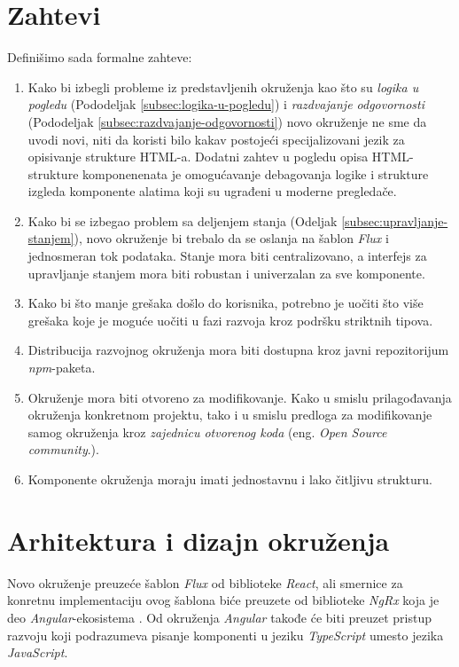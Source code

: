 \documentclass[12pt,oneside]{memoir}
\begin{document}
\section{Zahtevi}\label{sec:zahtevi}
Definišimo sada formalne zahteve:
\begin{enumerate}
  \item Kako bi izbegli probleme iz predstavljenih okruženja kao što su
  \emph{logika u pogledu} (Pododeljak \ref{subsec:logika-u-pogledu}) i
  \emph{razdvajanje odgovornosti} (Pododeljak \ref{subsec:razdvajanje-odgovornosti})
  novo okruženje ne sme da uvodi novi, niti da koristi bilo kakav postojeći
  specijalizovani jezik za opisivanje strukture HTML-a. Dodatni zahtev u pogledu
  opisa HTML-strukture komponenenata je omogućavanje debagovanja
  logike i strukture izgleda komponente alatima koji su ugrađeni u moderne pregledače. \label{zahtev:1}
  \item 
  Kako bi se izbegao problem sa deljenjem stanja (Odeljak \ref{subsec:upravljanje-stanjem}),
  novo okruženje bi trebalo da
  se oslanja na šablon \emph{Flux} i jednosmeran tok podataka.
  Stanje mora biti centralizovano, a interfejs za upravljanje stanjem
  mora biti robustan i univerzalan za sve komponente.
  \label{zahtev:2}
 \item Kako bi što manje grešaka došlo do korisnika, potrebno je uočiti
 što više grešaka koje je moguće uočiti u fazi razvoja kroz podršku striktnih tipova.
 \label{zahtev:3}
 \item Distribucija razvojnog okruženja mora biti dostupna kroz
 javni repozitorijum \emph{npm}-paketa. \label{zahtev:4}
 \item Okruženje mora biti otvoreno za modifikovanje. Kako u smislu prilagođavanja okruženja konkretnom projektu,
tako i u smislu predloga za modifikovanje samog okruženja kroz \emph{zajednicu otvorenog koda} (eng. \emph{Open Source community}.). \label{zahtev:5}
 \item Komponente okruženja moraju imati jednostavnu i lako čitljivu strukturu. \label{zahtev:6}
\end{enumerate}

\section{Arhitektura i dizajn okruženja}
Novo okruženje preuzeće šablon \emph{Flux} od biblioteke \emph{React}, ali smernice za konretnu implementaciju ovog šablona
biće preuzete od biblioteke \emph{NgRx} koja je deo \emph{Angular}-ekosistema \cite{NgRx}. Od okruženja \emph{Angular}
takođe će biti preuzet pristup razvoju koji podrazumeva pisanje komponenti u jeziku \emph{TypeScript} umesto jezika \emph{JavaScript}.
\end{document}
